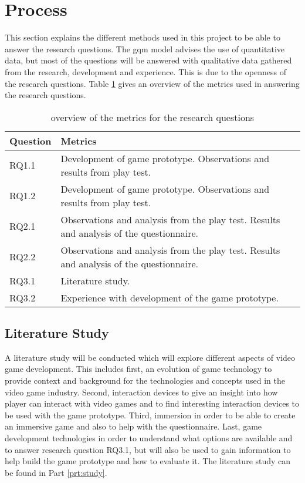 \section{Process}
This section explains the different methods used in this project to be able to answer the research questions. The \gls{gqm} model advises the use of quantitative data, but most of the questions will be answered with qualitative data gathered from the research, development and experience. This is due to the openness of the research questions. Table \ref{tab:method} gives an overview of the metrics used in answering the research questions.
\begin{table}[!ht]
	\label{tab:method}
	\caption{overview of the metrics for the research questions}
	\begin{tabularx}{\textwidth}{|l|X|}
		\hline \textbf{Question} & \textbf{Metrics} \\ 
		\hline RQ1.1 & Development of game prototype. Observations and results from play test. \\ 
		\hline RQ1.2 & Development of game prototype. Observations and results from play test. \\ 
		\hline RQ2.1 & Observations and analysis from the play test. Results and analysis of the questionnaire. \\ 
		\hline RQ2.2 & Observations and analysis from the play test. Results and analysis of the questionnaire. \\ 
		\hline RQ3.1 & Literature study. \\ 
		\hline RQ3.2 & Experience with development of the game prototype. \\ 
		\hline 
	\end{tabularx} 
\end{table}


\subsection{Literature Study}
A literature study will be conducted which will explore different aspects of video game development. This includes first, an evolution of game technology to provide context and background for the technologies and concepts used in the video game industry. Second, interaction devices to give an insight into how player can interact with video games and to find interesting interaction devices to be used with the game prototype. Third, immersion in order to be able to create an immersive game and also to help with the questionnaire. Last, game development technologies in order to understand what options are available and to answer research question RQ3.1, but will also be used to gain information to help build the game prototype and how to evaluate it. The literature study can be found in Part \ref{prt:study}.

